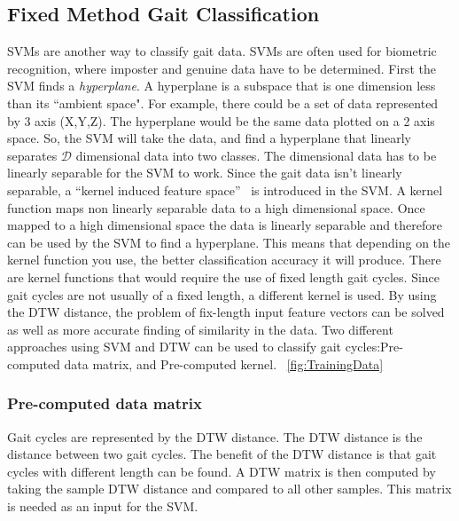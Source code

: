 \documentclass{sig-alternate}
\begin{document}
\subsection{Fixed Method Gait Classification}
	SVMs are another way to classify gait data. SVMs are often used for biometric recognition, where imposter and genuine data have to be determined. First the SVM finds a \textit{hyperplane}. A hyperplane is a subspace that is one dimension less than its ``ambient space". For example, there could be a set of data represented by 3 axis (X,Y,Z). The hyperplane would be the same data plotted on a 2 axis space. So, the SVM will take the data, and find a hyperplane that linearly separates \begin{math}\mathcal{D} \end{math} dimensional data into two classes. The dimensional data has to be linearly separable for the SVM to work. Since the gait data isn't linearly separable, a ``kernel induced feature space''~\cite{Muaaz:2013} is introduced in the SVM. A kernel function maps non linearly separable data to a high dimensional space. Once mapped to a high dimensional space the data is linearly separable and therefore can be used by the SVM to find a hyperplane. This means that depending on the kernel function you use, the better classification accuracy it will produce. 
There are kernel functions that would require the use of fixed length gait cycles. Since gait cycles are not usually of a fixed length, a different kernel is used. By using the DTW distance, the problem of fix-length input feature vectors can be solved as well as more accurate finding of similarity in the data. Two different approaches using SVM and DTW can be used to classify gait cycles:Pre-computed data matrix, and Pre-computed kernel. ~\ref{fig:TrainingData}

\subsubsection{Pre-computed data matrix}
	Gait cycles are represented by the DTW distance. The DTW distance is the distance between two gait cycles. The benefit of the DTW distance is that gait cycles with different length can be found. A DTW matrix is then computed by taking the sample DTW distance and compared to all other samples. This matrix is needed as an input for the SVM.
	
\end{document}
